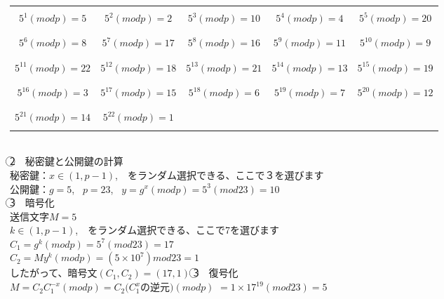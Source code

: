 \documentclass{article}
\begin{document}
\begin{spacing}{1.5}
\begin{table}[!hbp]
\begin{tabular}{|c|c|c|c|c|}
\hline
  &   &   &   & \\
$5^1(modp)=5$ & $5^2(modp)=2$ & $5^3(modp)=10$ & $5^4(modp)=4$ & $5^5(modp)=20$ \\
  &   &   &   & \\
\hline
  &   &   &   & \\
$5^6(modp)=8$ & $5^7(modp)=17$ & $5^8(modp)=16$ & $5^9(modp)=11$ & $5^{10}(modp)=9$ \\
  &   &   &   & \\
\hline
  &   &   &   & \\
$5^{11}(modp)=22$ & $5^{12}(modp)=18$ & $5^{13}(modp)=21$ & $5^{14}(modp)=13$ & $5^{15}(modp)=19$ \\
  &   &  &  & \\
\hline
  &   &   &   & \\
$5^{16}(modp)=3$ & $5^{17}(modp)=15$ & $5^{18}(modp)=6$ & $5^{19}(modp)=7$ & $5^{20}(modp)=12$ \\
  &   &   &   & \\
\hline
  &   &   &   & \\
$5^{21}(modp)=14$ & $5^{22}(modp)=1$ &   \  &   \  &   \  \\
  &   &   &   & \\
\hline
\end{tabular}
\end{table}
~\\
\textcircled{2}　秘密鍵と公開鍵の計算\\
秘密鍵：$x\in (1,p-1)$,　をランダム選択できる、ここで３を選びます\\
公開鍵：$g=5$, \ $p=23$, \ $y=g^x(modp)=5^3(mod23)=10$\\
\textcircled{3}　暗号化\\
送信文字$M=5$\\
$k\in (1,p-1)$,　をランダム選択できる、ここで7を選びます\\
$C_1=g^k(modp)=5^7(mod23)=17$\\
$C_2=My^k(modp)=(5\times 10^7)mod23=1$\\
したがって、暗号文$(C_1,C_2)=(17,1)$
\textcircled{3}　復号化\\
$M=C_2C_1^{-x}(modp)=C_2(C_1^x$の逆元$)(modp)$
$=1\times 17^19(mod23)=5$


\end{spacing}
\end{document}
